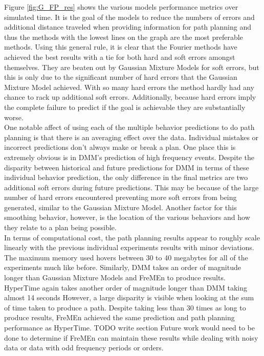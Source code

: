 Figure \ref{fig:G_FP_res} shows the various models performance metrics over
simulated time. It is the goal of the models to reduce the numbers of errors
and additional distance traveled when providing information for path planning
and thus the methods with the lowest lines on the graph are the most
preferable methods. Using this general rule, it is clear that the Fourier
methods have achieved the best results with a tie for both hard and soft errors
amongst themselves. They are beaten out by Gaussian Mixture Models for soft
errors, but this is only due to the significant number of hard errors that
the Gaussian Mixture Model achieved. With so many hard errors the method hardly
had any chance to rack up additional soft errors. Additionally, because hard
errors imply the complete failure to predict if the goal is achievable they
are substantially worse. \\

One notable affect of using each of the multiple behavior predictions to do path
planning is that there is an averaging effect over the data. Individual mistakes
or incorrect predictions don't always make or break a plan. One place this is
extremely obvious is in DMM's prediction of high frequency events.
Despite the disparity between historical and future predictions for DMM in
terms of these individual behavior prediction, the only difference in the final
metrics are two additional soft errors during future predictions. This may be
because of the large number of hard errors encountered preventing more
soft errors from being generated, similar to the Gaussian Mixture Model.
Another factor for this smoothing behavior, however, is the location of the
various behaviors and how they relate to a plan being possible. \\

In terms of computational cost, the path planning results appear to roughly
scale linearly with the previous individual experiments results with minor
deviations. The maximum memory used hovers between 30 to 40 megabytes for all
of the experiments much like before. Similarly, DMM takes an order of
magnitude longer than Gaussian Mixture Models and FreMEn to produce results.
HyperTime again takes another order of magnitude longer than DMM taking
almost 14 seconds However, a large disparity is visible when looking at the
sum of time taken to produce a path. Despite taking less than 30 times as long
to produce results, FreMEn achieved the same prediction and path planning
performance as HyperTime. TODO write section Future work would need to be done
to determine if FreMEn can maintain these results while dealing with noisy
data or data with odd frequency periods or orders. \\




